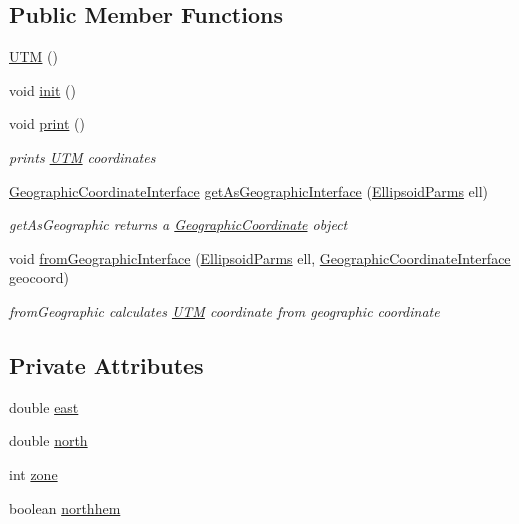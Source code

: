 \subsection*{Public Member Functions}
\begin{DoxyCompactItemize}
\item 
\hyperlink{classcoordinates_1_1_u_t_m_a073084a261396fbd5c408c6af8740b18}{U\+TM} ()
\item 
void \hyperlink{classcoordinates_1_1_u_t_m_acc60077a37c7b6f1d24c00401e97064d}{init} ()
\item 
void \hyperlink{classcoordinates_1_1_u_t_m_a40435144851f7e23b573debd797e0e97}{print} ()
\begin{DoxyCompactList}\small\item\em prints \hyperlink{classcoordinates_1_1_u_t_m}{U\+TM} coordinates \end{DoxyCompactList}\item 
\hyperlink{classcoordinates_1_1_geographic_coordinate_interface}{Geographic\+Coordinate\+Interface} \hyperlink{classcoordinates_1_1_u_t_m_a007d51832fcdc5eb721f04f23d4be8f9}{get\+As\+Geographic\+Interface} (\hyperlink{classparams_1_1_ellipsoid_parms}{Ellipsoid\+Parms} ell)
\begin{DoxyCompactList}\small\item\em get\+As\+Geographic returns a \hyperlink{classcoordinates_1_1_geographic_coordinate}{Geographic\+Coordinate} object \end{DoxyCompactList}\item 
void \hyperlink{classcoordinates_1_1_u_t_m_a8ce35fab81c41da52a3e006dd37c48b5}{from\+Geographic\+Interface} (\hyperlink{classparams_1_1_ellipsoid_parms}{Ellipsoid\+Parms} ell, \hyperlink{classcoordinates_1_1_geographic_coordinate_interface}{Geographic\+Coordinate\+Interface} geocoord)
\begin{DoxyCompactList}\small\item\em from\+Geographic calculates \hyperlink{classcoordinates_1_1_u_t_m}{U\+TM} coordinate from geographic coordinate \end{DoxyCompactList}\end{DoxyCompactItemize}
\subsection*{Private Attributes}
\begin{DoxyCompactItemize}
\item 
double \hyperlink{classcoordinates_1_1_u_t_m_adb4ff0c8fbf9f7829c23fb4ca2abba64}{east}
\item 
double \hyperlink{classcoordinates_1_1_u_t_m_a74bc382b61e98b1438c07e101de460e9}{north}
\item 
int \hyperlink{classcoordinates_1_1_u_t_m_a895d50db8cc3e81cb4d8ec1142a6939d}{zone}
\item 
boolean \hyperlink{classcoordinates_1_1_u_t_m_adb335a29a61081a69f82fb18047b2533}{northhem}
\end{DoxyCompactItemize}
